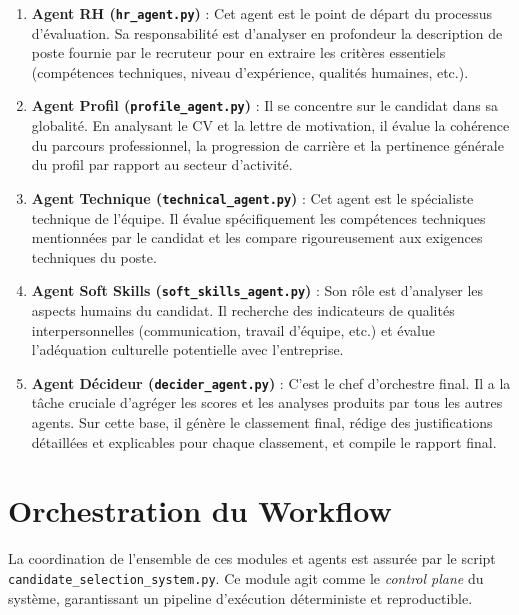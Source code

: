 \documentclass{rapportECL}
\begin{document}
\begin{enumerate}[leftmargin=*]
    \item \textbf{Agent RH (\texttt{hr\_agent.py})} : Cet agent est le point de départ du processus d'évaluation. Sa responsabilité est d'analyser en profondeur la description de poste fournie par le recruteur pour en extraire les critères essentiels (compétences techniques, niveau d'expérience, qualités humaines, etc.).
    
    \item \textbf{Agent Profil (\texttt{profile\_agent.py})} : Il se concentre sur le candidat dans sa globalité. En analysant le CV et la lettre de motivation, il évalue la cohérence du parcours professionnel, la progression de carrière et la pertinence générale du profil par rapport au secteur d'activité.
    
    \item \textbf{Agent Technique (\texttt{technical\_agent.py})} : Cet agent est le spécialiste technique de l'équipe. Il évalue spécifiquement les compétences techniques mentionnées par le candidat et les compare rigoureusement aux exigences techniques du poste.
    
    \item \textbf{Agent Soft Skills (\texttt{soft\_skills\_agent.py})} : Son rôle est d'analyser les aspects humains du candidat. Il recherche des indicateurs de qualités interpersonnelles (communication, travail d'équipe, etc.) et évalue l'adéquation culturelle potentielle avec l'entreprise.
    
    \item \textbf{Agent Décideur (\texttt{decider\_agent.py})} : C'est le chef d'orchestre final. Il a la tâche cruciale d'agréger les scores et les analyses produits par tous les autres agents. Sur cette base, il génère le classement final, rédige des justifications détaillées et explicables pour chaque classement, et compile le rapport final.
\end{enumerate}

\section{Orchestration du Workflow}

La coordination de l'ensemble de ces modules et agents est assurée par le script \texttt{candidate\_selection\_system.py}. Ce module agit comme le \textit{control plane} du système, garantissant un pipeline d'exécution déterministe et reproductible.
\end{document}
